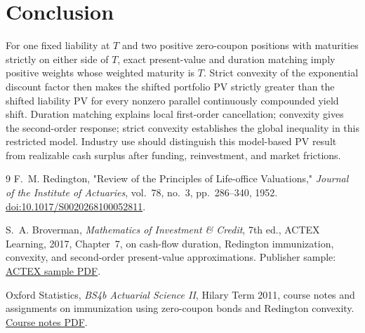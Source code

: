 \documentclass[11pt]{article}
\begin{document}
\section{Conclusion}
For one fixed liability at \(T\) and two positive zero-coupon positions with maturities strictly on either side of \(T\), exact present-value and duration matching imply positive weights whose weighted maturity is \(T\). Strict convexity of the exponential discount factor then makes the shifted portfolio PV strictly greater than the shifted liability PV for every nonzero parallel continuously compounded yield shift. Duration matching explains local first-order cancellation; convexity gives the second-order response; strict convexity establishes the global inequality in this restricted model. Industry use should distinguish this model-based PV result from realizable cash surplus after funding, reinvestment, and market frictions.

\begin{thebibliography}{9}
F.~M. Redington, "Review of the Principles of Life-office Valuations,"
\emph{Journal of the Institute of Actuaries}, vol.~78, no.~3, pp.~286--340,
1952. \href{https://doi.org/10.1017/S0020268100052811}{doi:10.1017/S0020268100052811}.

S.~A. Broverman, \emph{Mathematics of Investment \& Credit}, 7th ed.,
ACTEX Learning, 2017, Chapter~7, on cash-flow duration, Redington
immunization, convexity, and second-order present-value approximations.
Publisher sample:
\href{https://www.actuarialbookstore.com/samples/ACTEX_2FM-ACT-882216_sample_12-18-17.pdf}{ACTEX sample PDF}.

Oxford Statistics, \emph{BS4b Actuarial Science II}, Hilary Term 2011,
course notes and assignments on immunization using zero-coupon bonds and
Redington convexity.
\href{https://www.stats.ox.ac.uk/~winkel/bs4b11.pdf}{Course notes PDF}.
\end{thebibliography}
\end{document}
